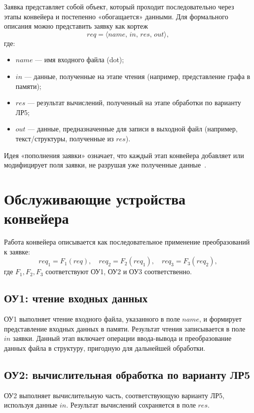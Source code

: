 Заявка представляет собой объект, который проходит последовательно через этапы конвейера и постепенно «обогащается» данными.
Для формального описания можно представить заявку как кортеж
\begin{equation}
	req = \langle name,\, in,\, res,\, out \rangle,
	\label{eq:req_model}
\end{equation}
где:
\begin{itemize}
	\item $name$ --- имя входного файла (dot);
	\item $in$ --- данные, полученные на этапе чтения (например, представление графа в памяти);
	\item $res$ --- результат вычислений, полученный на этапе обработки по варианту ЛР5;
	\item $out$ --- данные, предназначенные для записи в выходной файл (например, текст/структуры, полученные из $res$).
\end{itemize}

Идея «пополнения заявки» означает, что каждый этап конвейера добавляет или модифицирует поля заявки, не разрушая уже полученные данные~\cite{valedinsky2018}.

\section{Обслуживающие устройства конвейера}

Работа конвейера описывается как последовательное применение преобразований к заявке:
\begin{equation}
	req_1 = F_1(req), \quad req_2 = F_2(req_1), \quad req_3 = F_3(req_2),
	\label{eq:ou_funcs}
\end{equation}
где $F_1, F_2, F_3$ соответствуют ОУ1, ОУ2 и ОУ3 соответственно.

\subsection{ОУ1: чтение входных данных}
ОУ1 выполняет чтение входного файла, указанного в поле $name$, и формирует представление входных данных в памяти.
Результат чтения записывается в поле $in$ заявки.
Данный этап включает операции ввода-вывода и преобразование данных файла в структуру, пригодную для дальнейшей обработки.

\subsection{ОУ2: вычислительная обработка по варианту ЛР5}
ОУ2 выполняет вычислительную часть, соответствующую варианту ЛР5, используя данные $in$.
Результат вычислений сохраняется в поле $res$.

